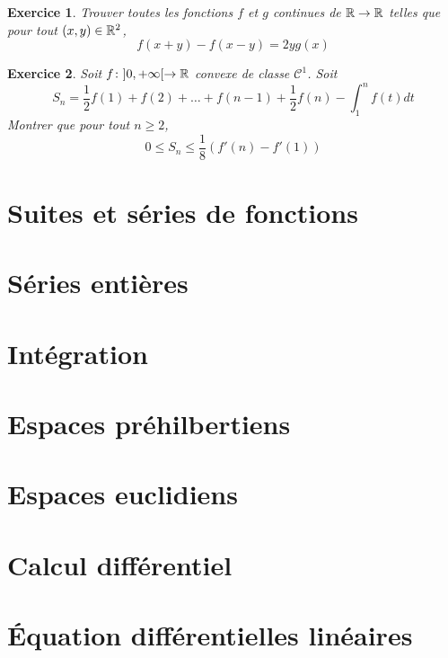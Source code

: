 \documentclass[12pt]{article}
\newtheorem{exercise}{Exercice}[section]
\theoremstyle{remark}
\theoremstyle{remark}
\begin{document}
\begin{exercise}
	Trouver toutes les fonctions $f$ et $g$ continues de $\mathbb{R}\to\mathbb{R}$ telles que pour tout $(x,y)\in\mathbb{R}^{2}$,
	$$f(x+y)-f(x-y)=2yg(x)$$
\end{exercise}

\begin{exercise}
	Soit $f\colon]0,+\infty[\to\mathbb{R}$ convexe de classe $\mathcal{C}^{1}$. Soit 
	$$S_{n}=\frac{1}{2}f(1)+f(2)+\dots+f(n-1)+\frac{1}{2}f(n)-\int_{1}^{n}f(t)dt$$
	Montrer que pour tout $n\geqslant2$, 
	$$0\leqslant S_{n}\leqslant\frac{1}{8}(f'(n)-f'(1))$$
\end{exercise}

\section{Suites et séries de fonctions}
\section{Séries entières}
\section{Intégration}
\section{Espaces préhilbertiens}
\section{Espaces euclidiens}
\section{Calcul différentiel}
\section{\'Equation différentielles linéaires}
\end{document}
